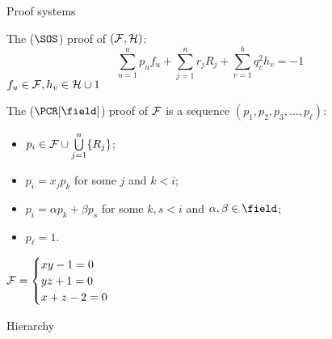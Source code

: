 \begin{frame}{Proof systems}

    The  ($\SOS$) proof of $(\Fs, \Hs)$:
    $$
        \sum_{u = 1}^{a} p_u f_u + \sum_{j = 1}^{n} r_j R_j + \sum_{v = 1}^{b} q_v^2 h_v = -1
    $$
    $f_u \in \Fs, h_v \in \Hs \cup {1}$

    \pause
    \vspace{0.4cm}

    The  ($\PCR[\field]$) proof of $\Fs$ is a sequence
    $(p_1, p_2, p_3, \dots, p_{\ell})$:
    \pause
    \begin{itemize}
        \item $p_i \in \Fs \cup \bigcup\limits_{j = 1}^{n} \{R_j\}$;
        \pause
        \item $p_i = x_j p_k$ for some $j$ and $k < i$;
        \pause    
        \item $p_i = \alpha p_k + \beta p_s$ for some $k, s < i$ and $\alpha, \beta \in \field$;
        \pause
            \item $p_{\ell} = 1$.
    \end{itemize}

    \pause
    \vspace{-0.2cm}
    \begin{minipage}{0.4\linewidth}
        $\Fs =
        \begin{cases}
            xy - 1 = 0 \\
            yz + 1 = 0 \\
            x + z - 2 = 0
        \end{cases}$
    \end{minipage}
    \pause
    \begin{minipage}{0.58\linewidth}
        \begin{prooftree}
        \end{prooftree}
    \end{minipage}
\end{frame}


\begin{frame}{Hierarchy}

    
    
\end{frame}



